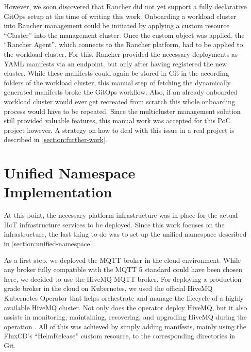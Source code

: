         However, we soon discovered that Rancher did not yet support a fully declarative GitOps setup at the time of writing this work. Onboarding a workload cluster into Rancher management could be initiated by applying a custom resource ``Cluster'' into the management cluster. Once the custom object was applied, the ``Rancher Agent'', which connects to the Rancher platform, had to be applied to the workload cluster. For this, Rancher provided the necessary deployments as YAML manifests via an endpoint, but only after having registered the new cluster. While these manifests could again be stored in Git in the according folders of the workload cluster, this manual step of fetching the dynamically generated manifests broke the GitOps workflow. Also, if an already onboarded workload cluster would ever get recreated from scratch this whole onboarding process would have to be repeated. Since the multicluster management solution still provided valuable features, this manual work was accepted for this PoC project however. A strategy on how to deal with this issue in a real project is described in \autoref{section:further-work}.


    \section{Unified Namespace Implementation}

        At this point, the necessary platform infrastructure was in place for the actual IIoT infrastructure services to be deployed. Since this work focuses on the infrastructure, the last thing to do was to set up the unified namespace described in \autoref{section:unified-namespace}. 

        As a first step, we deployed the MQTT broker in the cloud environment. While any broker fully compatible with the MQTT 5 standard could have been chosen here, we decided to use the HiveMQ MQTT broker. For deploying a production-grade broker in the cloud on Kubernetes, we used the official HiveMQ Kubernetes Operator that helps orchestrate and manage the lifecycle of a highly available HiveMQ cluster. Not only does the operator deploy HiveMQ, but it also assists in monitoring, maintaining, recovering, and upgrading HiveMQ during the operation \cite{hivemq_operator}. All of this was achieved by simply adding manifests, mainly using the FluxCD's ``HelmRelease'' custom resource, to the corresponding directories in Git.
        
